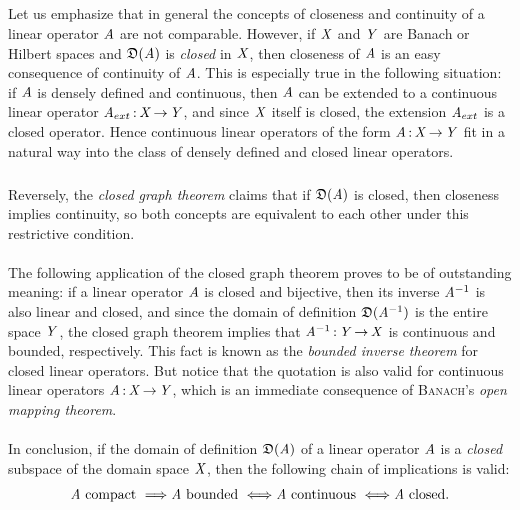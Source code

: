 \documentclass[11pt,twoside]{article}
\begin{document}
\subsection{} %
Let us emphasize that in general 
the concepts of closeness and continuity of a linear operator $\mathit{A}$
are not comparable.
However,
if $\mathit{X}$ and $\mathit{Y}$ are Banach or Hilbert spaces
and $\mathfrak{D}(\mathit{A})$ is \textit{closed} in $\mathit{X}$,
then closeness of $\mathit{A}$ is an easy consequence of continuity of $\mathit{A}$.
This is especially true in the following situation:
if $\mathit{A}$ is densely defined and continuous,
then $\mathit{A}$ can be extended to a continuous linear operator
$\mathit{A}_{ext} {\,:\,} \mathit{X} {\,\to\,} \mathit{Y}$,
and since $\mathit{X}$ itself is closed,
the extension $\mathit{A}_{ext}$ is a closed operator.
Hence continuous linear operators of the form $\mathit{A} {\,:\,} \mathit{X} {\,\to\,} \mathit{Y}$
fit in a natural way
into the class of densely defined and closed linear operators.

\subparagraph{} %
Reversely,
the \textit{closed graph theorem} claims that if $\mathfrak{D}(\mathit{A})$ is closed,
then closeness implies continuity,
so both concepts are equivalent to each other
under this restrictive condition.

\paragraph{} %
The following application of the closed graph theorem
proves to be of outstanding meaning:
if a linear operator $\mathit{A}$ is closed and bijective,
then its inverse $\mathit{A}^{-1}$ is also linear and closed,
and since the domain of definition $\mathfrak{D}(\mathit{A}^{-1})$
is the entire space $\mathit{Y}$,
the closed graph theorem implies that $\mathit{A}^{-1} {\,:\,} \mathit{Y} {\,\to\,} \mathit{X}$
is continuous and bounded,
respectively.
This fact is known as the \textit{bounded inverse theorem}
for closed linear operators.
But notice that the quotation is also valid for continuous linear operators
$\mathit{A} {\,:\,} \mathit{X} {\,\to\,} \mathit{Y}$,
which is an immediate consequence
of \textsc{Banach}'s \textit{open mapping theorem}.

\paragraph{} %
In conclusion,
if the domain of definition $\mathfrak{D}(\mathit{A})$ of a linear operator $\mathit{A}$
is a \textit{closed} subspace of the domain space $\mathit{X}$,
then the following chain of implications is valid:
\[
\linA \mbox{ compact }    \Longrightarrow
\linA \mbox{ bounded }    \Longleftrightarrow
\linA \mbox{ continuous } \Longleftrightarrow
\linA \mbox{ closed}. %
\]
\end{document}
